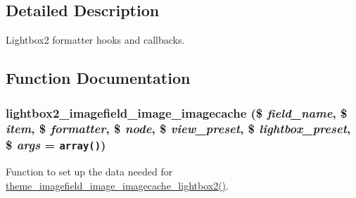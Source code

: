 \subsection{Detailed Description}
Lightbox2 formatter hooks and callbacks. 

\subsection{Function Documentation}
\hypertarget{lightbox2_8formatter_8inc_0aa92673e347b0308d7495cff8c4a9e1}{
\subsubsection[{lightbox2\_\-imagefield\_\-image\_\-imagecache}]{\setlength{\rightskip}{0pt plus 5cm}lightbox2\_\-imagefield\_\-image\_\-imagecache (\$ {\em field\_\-name}, \/  \$ {\em item}, \/  \$ {\em formatter}, \/  \$ {\em node}, \/  \$ {\em view\_\-preset}, \/  \$ {\em lightbox\_\-preset}, \/  \$ {\em args} = {\tt array()})}}
\label{lightbox2_8formatter_8inc_0aa92673e347b0308d7495cff8c4a9e1}


Function to set up the data needed for \hyperlink{lightbox2_8formatter_8inc_8d796df1969b3548e0c86b5e6456c1bc}{theme\_\-imagefield\_\-image\_\-imagecache\_\-lightbox2()}.

